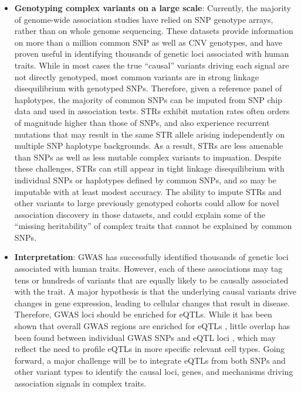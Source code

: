 \begin{itemize}
\item \textbf{Genotyping complex variants on a large scale}: Currently, the majority of genome-wide association studies have relied on SNP genotype arrays, rather than on whole genome sequencing. These datasets provide information on more than a million common SNP as well as CNV genotypes, and have proven useful in identifying thousands of genetic loci associated with human traits. While in most cases the true ``causal'' variants driving each signal are not directly genotyped, most common variants are in strong linkage disequilibrium with genotyped SNPs. Therefore, given a reference panel of haplotypes, the majority of common SNPs can be imputed from SNP chip data and used in association tests. STRs exhibit mutation rates often orders of magnitude higher than those of SNPs, and also experience recurrent mutations that may result in the same STR allele arising independently on multiple SNP haplotype backgrounds. As a result, STRs are less amenable than SNPs as well as less mutable complex variants to impuation. 
Despite these challenges, STRs can still appear in tight linkage disequilibrium with individual SNPs or haplotypes defined by common SNPs, and so may be imputable with at least modest accuracy. The ability to impute STRs and other variants to large previously genotyped cohorts could allow for novel association discovery in those datasets, and could explain some of the ``missing heritability'' of complex traits that cannot be explained by common SNPs. 

\item \textbf{Interpretation}: GWAS has successfully identified thousands of genetic loci associated with human traits. However, each of these associations may tag tens or hundreds of variants that are equally likely to be causally associated with the trait. A major hypothesis is that the underlying causal variants drive changes in gene expression, leading to cellular changes that result in disease. Therefore, GWAS loci should be enriched for eQTLs. While it has been shown that overall GWAS regions are enriched for eQTLs \cite{NicolaeGamazonZhangEtAl2010}, little overlap has been found between individual GWAS SNPs and eQTL loci \cite{HuangFangJostinsEtAl2015}, which may reflect the need to profile eQTLs in more specific relevant cell types. Going forward, a major challenge will be to integrate eQTLs from both SNPs and other variant types to identify the causal loci, genes, and mechanisms driving association signals in complex traits.

\end{itemize}

